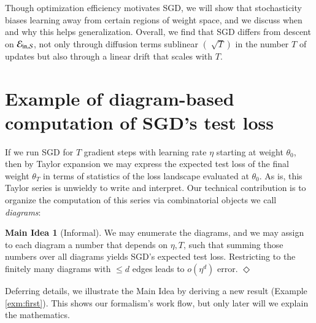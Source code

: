 \documentclass[openany, notitlepage, justified]{tufte-book}
\theoremstyle{plain}
\theoremstyle{definition}
\newtheorem*{midea*}{Main Idea}
\newcommand{\wasq}[1]{\left[#1\right]}
\newcommand{\expc}{\mathbb{E}}
\newcommand{\mend}{\hfill $\Diamond$}
\begin{document}
            Though optimization efficiency motivates SGD, we will show that
            stochasticity biases learning away from certain regions of weight
            space, and we discuss when and why this helps generalization.
            Overall, we find that SGD differs from descent on $\mathcal{E}_{\text{in},\mathcal{S}}$, not only
            through diffusion terms sublinear $(\sqrt[]{T})$ in the number $T$
            of updates but also through a linear drift that scales with $T$.

    \section{Example of diagram-based computation of SGD's test loss} \label{subsect:example}

        \newcommand{\nb} { \nabla }
        \newcommand{\lx} { l_x(\theta) }
        \newcommand{\teq} { \triangleq }
        \newcommand{\ex}[1] { \expc_x \wasq{#1} }

        If we run SGD for $T$ gradient steps with learning rate $\eta$ starting
        at weight $\theta_0$, then by Taylor expansion we may express the
        expected test loss of the final weight $\theta_T$ in terms of
        statistics of the loss landscape evaluated at $\theta_0$.
        As is, this Taylor series is unwieldy to write and interpret.
        Our technical contribution is to organize the computation of this
        series via combinatorial objects we call
        \emph{diagrams}:
        \begin{midea*}[Informal]
            We may enumerate the diagrams, and we may assign to
            each diagram a number that depends on $\eta, T$, such that
            summing those numbers over all diagrams yields SGD's expected test
            loss.  Restricting to the finitely many diagrams with $\leq d$
            edges leads to $o(\eta^d)$ error.
            \mend
        \end{midea*}

        Deferring details, we illustrate the Main Idea by deriving a new result
        (Example \ref{exm:first}).  This shows our formalism's work flow,
        but only later will we explain the mathematics.
\end{document}
